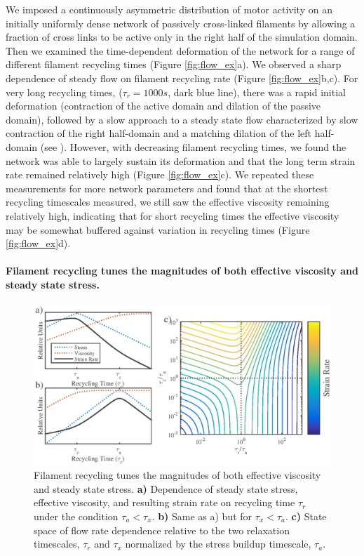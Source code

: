 \documentclass[10pt,letterpaper]{article}
\begin{document}
We imposed a continuously asymmetric distribution of motor activity on an initially uniformly dense network of passively cross-linked filaments by allowing a fraction of cross links to be active only in the right half of the simulation domain. Then we examined the time-dependent deformation of the network for a range of different filament recycling times (Figure \ref{fig:flow_ex}a). We observed a sharp dependence of steady flow on filament recycling rate (Figure \ref{fig:flow_ex}b,c). For very long recycling times, ($\tau_r=1000 s$, dark blue line), there was a rapid initial deformation (contraction of the active domain and dilation of the passive domain), followed by a slow approach to a steady state flow characterized by slow contraction of the right half-domain and a matching dilation of the left half-domain (see ).  However, with decreasing filament recycling times, we found the network was able to largely sustain its deformation and that the long term strain rate remained relatively high (Figure \ref{fig:flow_ex}c).  We repeated these measurements for more network parameters and found that at the shortest recycling timescales measured, we still saw the effective viscosity remaining relatively high, indicating that for short recycling times the effective viscosity may be somewhat buffered against variation in recycling times (Figure \ref{fig:flow_ex}d).







\paragraph{Filament recycling tunes the magnitudes of both effective viscosity and steady state stress.}  


\begin{figure}[h!]
	\centering
	\includegraphics[width=\hsize]{figures/figure_theor}
	\caption{\label{fig:flow_theo}  Filament recycling tunes the magnitudes of both effective viscosity and steady state stress. \textbf{a)}  Dependence of steady state stress, effective viscosity, and resulting strain rate on recycling time $\tau_r$ under the condition $\tau_a<\tau_x$. \textbf{b)} Same as a) but for $\tau_x<\tau_a$.  \textbf{c)} State space of flow rate dependence relative to the two relaxation timescales, $\tau_r$ and $\tau_x$ normalized by the stress buildup timescale, $\tau_a$.  }
\end{figure}
\end{document}
